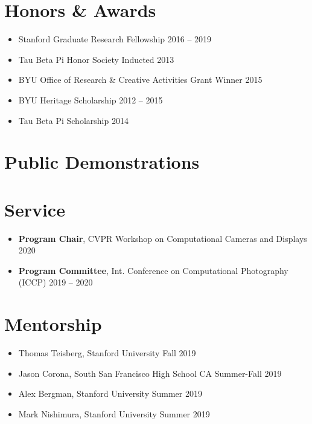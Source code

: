 \documentclass[10pt,letter,sans]{moderncv}
\begin{document}
\vspace{3mm}
\section{Honors \& Awards}
\begin{itemize}
    \item Stanford Graduate Research Fellowship \hfill 2016 -- 2019
    \item Tau Beta Pi Honor Society \hfill Inducted 2013
    \item BYU Office of Research \& Creative Activities Grant Winner \hfill 2015
    \item BYU Heritage Scholarship \hfill 2012 -- 2015
    \item Tau Beta Pi Scholarship \hfill 2014
\end{itemize}
  \vspace{-5mm}


\vspace{5mm}
\section{Public Demonstrations}
  \vspace{-5mm}


\vspace{3mm}
\section{Service}
\begin{itemize}
    \item {\bf Program Chair}, CVPR Workshop on Computational Cameras and Displays \hfill 2020
    \item {\bf Program Committee}, Int. Conference on Computational Photography (ICCP) \hfill 2019 -- 2020
\end{itemize}
  \vspace{-5mm}


\vspace{3mm}
\section{Mentorship}
\begin{itemize}
    \item Thomas Teisberg, Stanford University \hfill Fall 2019
    \item Jason Corona, South San Francisco High School CA \hfill Summer-Fall 2019
    \item Alex Bergman, Stanford University \hfill Summer 2019
    \item Mark Nishimura, Stanford University \hfill Summer 2019
\end{itemize}
  \vspace{-5mm}
\end{document}
